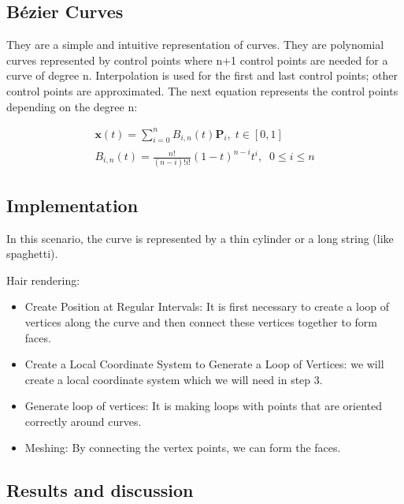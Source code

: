 \documentclass{article}
\begin{document}
	\subsection{Bézier Curves}
	They are a simple and intuitive representation of curves. They are polynomial curves represented by control points where n+1 control points are needed for a curve of degree n.
	Interpolation is used for the first and last control points; other control points are approximated. The next equation represents the control points depending on the degree n: 
	
	\begin{equation}
		\begin{split}
			\pmb{x}(t)=\sum_{i = 0}^{n} B_{i,n}(t) \pmb{P}_i, \; t \in [0,1] \\
			B_{i,n}(t) = \frac{n!}{(n - i)!i!}(1-t)^{n-i}t^i , \;\; 0 \leq i \leq n
		\end{split}		
	\end{equation}
	\subsection{Implementation}
	In this scenario, the curve is represented by a thin cylinder or a long string (like spaghetti).
	
	Hair rendering:
	\begin{itemize}
		\item Create Position at Regular Intervals:
		It is first necessary to create a loop of vertices along the curve and then connect these vertices together to form faces.
		\item Create a Local Coordinate System to Generate a Loop of Vertices: we will create a local coordinate system which we will need in step 3.
		
		\item Generate loop of vertices:
		It is making loops with points that are oriented correctly around curves.
		
		\item Meshing: By connecting the vertex points, we can form the faces.
	\end{itemize}	
	
	\subsection{Results and discussion}
	
\end{document}
